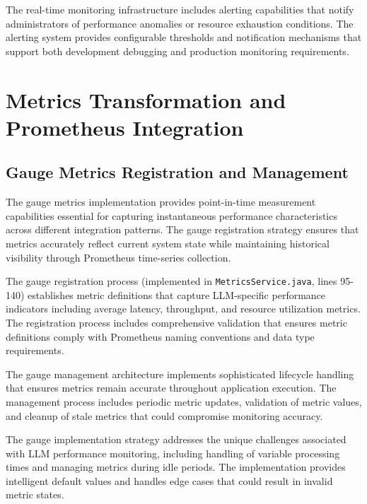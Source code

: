 
The real-time monitoring infrastructure includes alerting capabilities that notify administrators of performance anomalies or resource exhaustion conditions. The alerting system provides configurable thresholds and notification mechanisms that support both development debugging and production monitoring requirements.


\section{Metrics Transformation and Prometheus Integration}

\subsection{Gauge Metrics Registration and Management}

The gauge metrics implementation provides point-in-time measurement capabilities essential for capturing instantaneous performance characteristics across different integration patterns. The gauge registration strategy ensures that metrics accurately reflect current system state while maintaining historical visibility through Prometheus time-series collection.

The gauge registration process (implemented in \texttt{MetricsService.java}, lines 95-140) establishes metric definitions that capture LLM-specific performance indicators including average latency, throughput, and resource utilization metrics. The registration process includes comprehensive validation that ensures metric definitions comply with Prometheus naming conventions and data type requirements.


The gauge management architecture implements sophisticated lifecycle handling that ensures metrics remain accurate throughout application execution. The management process includes periodic metric updates, validation of metric values, and cleanup of stale metrics that could compromise monitoring accuracy.

The gauge implementation strategy addresses the unique challenges associated with LLM performance monitoring, including handling of variable processing times and managing metrics during idle periods. The implementation provides intelligent default values and handles edge cases that could result in invalid metric states.

